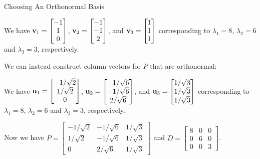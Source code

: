 \documentclass[xcolor=dvipsnames,aspectratio=169,t]{beamer}
\begin{document}
\begin{frame}{Choosing An Orthonormal Basis}
\smallskip

We have $\mathbf{v}_1 = \begin{bmatrix} -1 \\ 1 \\ 0 \end{bmatrix}$, $\mathbf{v}_2 = \begin{bmatrix} -1 \\ -1 \\ 2 \end{bmatrix}$, and $\mathbf{v}_3 = \begin{bmatrix} 1 \\ 1 \\ 1 \end{bmatrix}$ corresponding to $\lambda_1 = 8$, $\lambda_2 = 6$ and $\lambda_3 = 3$, respectively.
\bigskip

\pause
We can instead construct column vectors for $P$ that are \alert{orthonormal}:
\medskip

We have \alert{$\mathbf{u}_1 = \begin{bmatrix} -1/\sqrt{2} \\ 1/\sqrt{2} \\ 0 \end{bmatrix}$}, \alert{$\mathbf{u}_2 = \begin{bmatrix} -1/\sqrt{6} \\ -1/\sqrt{6} \\ 2/\sqrt{6} \end{bmatrix}$}, and \alert{$\mathbf{u}_3 = \begin{bmatrix} 1/\sqrt{3} \\ 1/\sqrt{3} \\ 1/\sqrt{3} \end{bmatrix}$} corresponding to $\lambda_1 = 8$, $\lambda_2 = 6$ and $\lambda_3 = 3$, respectively.
\bigskip

\pause
Now we have $P = \begin{bmatrix} -1/\sqrt{2} & -1/\sqrt{6} & 1/\sqrt{3} \\ 1/\sqrt{2} & -1/\sqrt{6} & 1/\sqrt{3} \\ 0 & 2/\sqrt{6} & 1/\sqrt{3} \end{bmatrix}$ and $D = \begin{bmatrix} 8 & 0 & 0 \\ 0 & 6 & 0 \\ 0 & 0 & 3 \end{bmatrix}$.

\end{frame}
\end{document}
